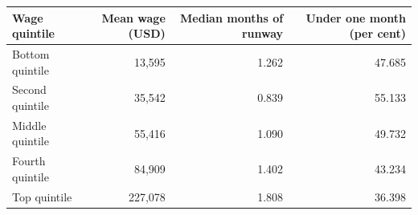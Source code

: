 \begin{tabular}{lrrr}
\toprule
Wage quintile & Mean wage (USD) & Median months of runway & Under one month (per cent) \\
\midrule
Bottom quintile & 13,595 & 1.262 & 47.685 \\
Second quintile & 35,542 & 0.839 & 55.133 \\
Middle quintile & 55,416 & 1.090 & 49.732 \\
Fourth quintile & 84,909 & 1.402 & 43.234 \\
Top quintile & 227,078 & 1.808 & 36.398 \\
\bottomrule
\end{tabular}

